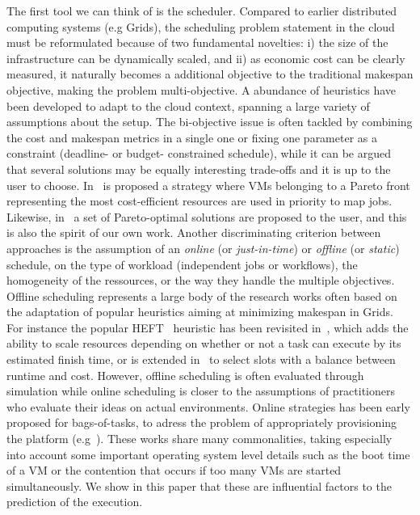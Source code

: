 \documentclass[10pt,conference,compsocconf]{IEEEtran}
\begin{document}
The first tool we can think of is the scheduler. Compared to earlier distributed
computing systems  (e.g Grids),  the scheduling problem  statement in  the cloud
must be  reformulated because of two  fundamental novelties: i) the  size of the
infrastructure  can be  dynamically  scaled, and  ii) as  economic  cost can  be
clearly measured, it naturally becomes a additional objective to the traditional
makespan  objective,  making  the   problem  multi-objective.   A  abundance  of
heuristics have been  developed to adapt to the cloud  context, spanning a large
variety of assumptions about the setup.  The bi-objective issue is often tackled
by  combining the  cost and  makespan  metrics in  a  single one  or fixing  one
parameter as a constraint (deadline-  or budget- constrained schedule), while it
can be argued  that several solutions may be equally  interesting trade-offs and
it is up to the user to choose.  In~\cite{Su13} is proposed a strategy where VMs
belonging to a  Pareto front representing the most  cost-efficient resources are
used  in  priority  to  map  jobs.  Likewise,  in~\cite{Durillo14}  a  set  of
Pareto-optimal solutions are  proposed to the user, and this  is also the spirit
of our  own work.   Another discriminating criterion  between approaches  is the
assumption of  an \emph{online}  (or \emph{just-in-time}) or  \emph{offline} (or
\emph{static})  schedule,  on   the  type  of  workload   (independent  jobs  or
workflows),  the homogeneity  of  the ressources,  or the  way  they handle  the
multiple objectives.  Offline scheduling represents a large body of the research
works often based  on the adaptation of popular heuristics  aiming at minimizing
makespan in Grids.  For instance  the popular HEFT~\cite{Zhao2003} heuristic has
been  revisited in~\cite{LinL11},  which  adds the  ability  to scale  resources
depending on whether or not a task  can execute by its estimated finish time, or
is extended in~\cite{Li11cost-conscious} to select  slots with a balance between
runtime  and  cost.  However,  offline  scheduling  is often  evaluated  through
simulation while online scheduling is closer to the assumptions of practitioners
who evaluate  their ideas  on actual environments.   Online strategies  has been
early  proposed  for  bags-of-tasks,  to adress  the  problem  of  appropriately
provisioning                             the                            platform
(e.g~\cite{MarshallKF10,GenaudG11,DuongLG11,VillegasASI12}).  These  works share
many  commonalities, taking  especially  into account  some important  operating
system level details such as the boot time of a VM or the contention that occurs
if too many VMs are started simultaneously. We show in this paper that these are
influential factors to the prediction of the execution.
  
\end{document}
